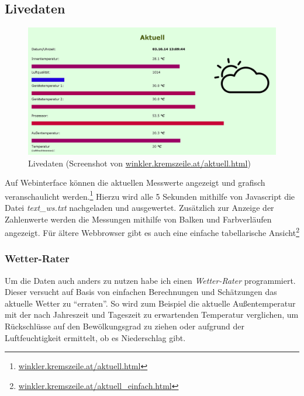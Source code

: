 \subsection{Livedaten}
\label{subsec:Livedaten}

\begin{figure}[h]
  \centering
     \includegraphics[width=\textwidth]{figures/aktuell.png}
  \caption{Livedaten (Screenshot von \href{http://winkler.kremszeile.at/aktuell.html}{winkler.kremszeile.at/aktuell.html})}
  \label{fig:display_neu}
\end{figure}

Auf Webinterface können die aktuellen Messwerte angezeigt und grafisch veranschaulicht werden.\footnote{\href{http://winkler.kremszeile.at/aktuell.html}{winkler.kremszeile.at/aktuell.html}}
Hierzu wird alle 5 Sekunden mithilfe von \gls{Javascript} die Datei \emph{text\_ws.txt} nachgeladen und ausgewertet. Zusätzlich zur Anzeige der Zahlenwerte werden die Messungen mithilfe von Balken und Farbverläufen angezeigt. Für ältere Webbrowser gibt es auch eine einfache tabellarische Ansicht\footnote{\href{http://winkler.kremszeile.at/aktuell_einfach.html}{winkler.kremszeile.at/aktuell\_einfach.html}}

\subsubsection{Wetter-Rater}
\label{subsubsec:Wetterrater}

Um die Daten auch anders zu nutzen habe ich einen \emph{Wetter-Rater} programmiert. Dieser versucht auf Basis von einfachen Berechnungen und Schätzungen das aktuelle Wetter zu \enquote{erraten}. So wird zum Beispiel die aktuelle Außentemperatur mit der nach Jahreszeit und Tageszeit zu erwartenden Temperatur verglichen, um Rückschlüsse auf den Bewölkungsgrad zu ziehen oder aufgrund der Luftfeuchtigkeit ermittelt, ob es Niederschlag gibt.

